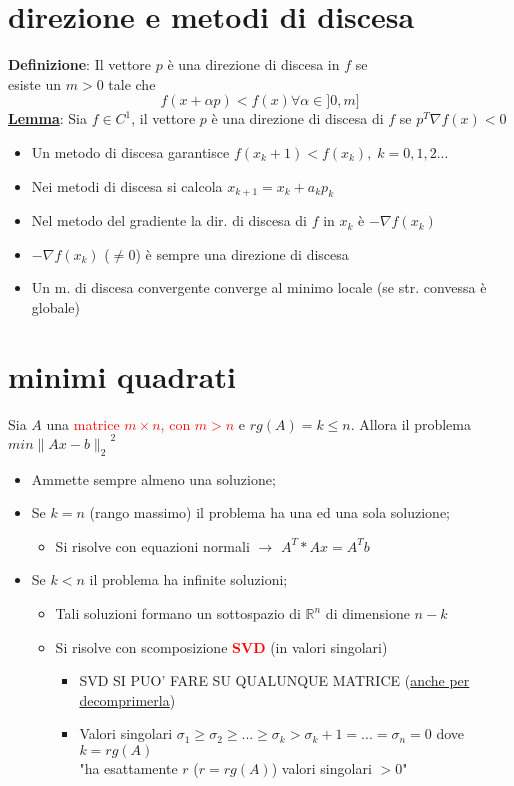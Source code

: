 \documentclass{article}
\newcommand\norm[1]{\lVert#1\rVert}	%
\begin{document}
	\section{direzione e metodi di discesa}

		\textbf{Definizione}: Il vettore $p$ è una direzione di discesa in $f$ se\\ esiste un $m > 0$ tale che
		\[
			f(x + \alpha p ) < f(x) \forall \alpha \in ] 0, m ]
		\]
		\underline{\textbf{Lemma}}: Sia $f \in C^1$, il vettore $p$ è una direzione di discesa di $f$ se \textbf{ $p^T \nabla f(x) < 0$ }
		\begin{itemize}
			\item Un metodo di discesa garantisce $f(x_k + 1) < f(x_k), \; k = 0, 1, 2 ...$
			\item Nei metodi di discesa si calcola $x_{k+1} = x_k + a_k p_k$
			\item Nel metodo del gradiente la dir. di discesa di $f$ in $x_k$ è $ - \nabla f(x_k)$
			\item $ - \nabla f(x_k)$ ($\neq 0$) è sempre una direzione di discesa
			\item Un m. di discesa convergente converge al minimo locale (se str. convessa è globale)
		\end{itemize}

	\section{minimi quadrati}

		Sia $A$ una \textcolor{red}{matrice $m \times n$, con $m > n$} e $rg(A) = k \leq n$.
		Allora il problema $min {\norm{A x - b}_2}^2$
		\begin{itemize}
			\item Ammette sempre almeno una soluzione;
			\item Se $k = n$ (rango massimo) il problema ha una ed una sola soluzione;
			\begin{itemize}
				\item Si risolve con equazioni normali $\rightarrow$ \textbf{ $A^T * A x = A^T b$ }
			\end{itemize}
			\item Se $k < n$ il problema ha infinite soluzioni;
			\begin{itemize}
				\item Tali soluzioni formano un sottospazio di $\mathbb{R}^n$ di dimensione $n - k$
				\item Si risolve con scomposizione \textbf{\textcolor{red}{SVD}} (in valori singolari)
				\begin{itemize}
					\item SVD SI PUO' FARE SU QUALUNQUE MATRICE (\underline{anche per decomprimerla})
					\item Valori singolari $\sigma_1 \geq \sigma_2 \geq ... \geq \sigma_k > \sigma_k+1 = ... = \sigma_n = 0$ dove $k = rg(A)$ \\
					"ha esattamente $r$ ($r = rg(A)$) valori singolari $> 0$"
				\end{itemize}
			\end{itemize}
		\end{itemize}
\end{document}
